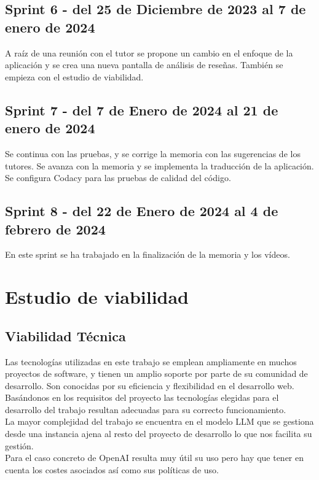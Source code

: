 \subsection{Sprint 6 - del 25 de Diciembre de 2023 al 7 de enero de 2024}
A raíz de una reunión con el tutor se propone un cambio en el enfoque de la aplicación y 
se crea una nueva pantalla de análisis de reseñas.
También se empieza con el estudio de viabilidad.
\subsection{Sprint 7 - del 7 de Enero de 2024 al 21 de enero de 2024}
Se continua con las pruebas, y se corrige la memoria con las sugerencias de los tutores.
Se avanza con la memoria y se implementa la traducción de la aplicación.
Se configura Codacy para las pruebas de calidad del código.

\subsection{Sprint 8 - del 22 de Enero de 2024 al 4 de febrero de 2024}
En este sprint se ha trabajado en la finalización de la memoria y los vídeos.

\section{Estudio de viabilidad}

\subsection{Viabilidad Técnica}

Las tecnologías utilizadas en este trabajo se emplean ampliamente en muchos proyectos de software, y 
tienen un amplio soporte por parte de su comunidad de desarrollo. Son conocidas por su eficiencia y 
flexibilidad en el desarrollo web.\\
Basándonos en los requisitos del proyecto las tecnologías elegidas para el desarrollo del trabajo 
resultan adecuadas para su correcto funcionamiento.\\
La mayor complejidad del trabajo se encuentra en el modelo LLM que se gestiona desde una instancia ajena al 
resto del proyecto de desarrollo lo que nos facilita su gestión.\\
Para el caso concreto de OpenAI resulta muy útil su uso pero hay que tener en cuenta los costes asociados 
así como sus políticas de uso.

